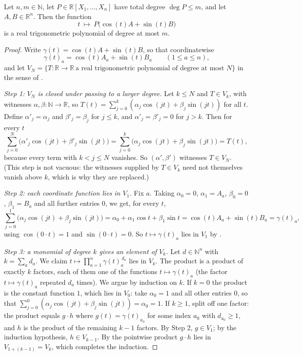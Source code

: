 \begin{lemma}
Let $n,m\in\mathbb{N}$, let $P\in\mathbb{R}[X_1,\dots,X_n]$ have total degree
$\deg P\le m$, and let $A,B\in\mathbb{R}^n$. Then the function
\[
  t\ \longmapsto\ P\bigl(\cos(t)A+\sin(t)B\bigr)
\]
is a real trigonometric polynomial of degree at most $m$.
\end{lemma}
\begin{proof}
Write $\gamma(t)=\cos(t)A+\sin(t)B$, so that coordinatewise
\begin{equation}\label{eq:gctp-coord}
  \gamma(t)_a=\cos(t)A_a+\sin(t)B_a\qquad(1\le a\le n),
\end{equation}
and let $V_N=\{T:\mathbb{R}\to\mathbb{R}\ \text{a real trigonometric polynomial
of degree at most }N\}$ in the sense of .

\emph{Step 1: $V_N$ is closed under passing to a larger degree.} Let $k\le N$ and
$T\in V_k$, with witnesses $\alpha,\beta:\mathbb{N}\to\mathbb{R}$, so
$T(t)=\sum_{j=0}^{k}(\alpha_j\cos(jt)+\beta_j\sin(jt))$ for all $t$. Define
$\alpha'_j=\alpha_j$ and $\beta'_j=\beta_j$ for $j\le k$, and
$\alpha'_j=\beta'_j=0$ for $j>k$. Then for every $t$
\[
  \sum_{j=0}^{N}\bigl(\alpha'_j\cos(jt)+\beta'_j\sin(jt)\bigr)
  =\sum_{j=0}^{k}\bigl(\alpha_j\cos(jt)+\beta_j\sin(jt)\bigr)=T(t),
\]
because every term with $k<j\le N$ vanishes. So $(\alpha',\beta')$ witnesses
$T\in V_N$. (This step is not vacuous: the witnesses supplied by $T\in V_k$ need
not themselves vanish above $k$, which is why they are replaced.)

\emph{Step 2: each coordinate function lies in $V_1$.} Fix $a$. Taking
$\alpha_0=0$, $\alpha_1=A_a$, $\beta_0=0$, $\beta_1=B_a$ and all further entries
$0$, we get, for every $t$,
\[
  \sum_{j=0}^{1}\bigl(\alpha_j\cos(jt)+\beta_j\sin(jt)\bigr)
  =\alpha_0+\alpha_1\cos t+\beta_1\sin t
  =\cos(t)A_a+\sin(t)B_a=\gamma(t)_a ,
\]
using $\cos(0\cdot t)=1$ and $\sin(0\cdot t)=0$. So $t\mapsto\gamma(t)_a$ lies in
$V_1$ by .

\emph{Step 3: a monomial of degree $k$ gives an element of $V_k$.} Let
$d\in\mathbb{N}^n$ with $k=\sum_a d_a$. We claim
$t\mapsto\prod_{a=1}^{n}\gamma(t)_a^{\,d_a}$ lies in $V_k$. The product is a
product of exactly $k$ factors, each of them one of the functions
$t\mapsto\gamma(t)_a$ (the factor $t\mapsto\gamma(t)_a$ repeated $d_a$ times).
We argue by induction on $k$. If $k=0$ the product is the constant function $1$,
which lies in $V_0$: take $\alpha_0=1$ and all other entries $0$, so that
$\sum_{j=0}^{0}(\alpha_j\cos(jt)+\beta_j\sin(jt))=\alpha_0=1$. If $k\ge1$, split
off one factor: the product equals $g\cdot h$ where $g(t)=\gamma(t)_{a_0}$ for
some index $a_0$ with $d_{a_0}\ge1$, and $h$ is the product of the remaining
$k-1$ factors. By Step 2, $g\in V_1$; by the induction hypothesis, $h\in V_{k-1}$.
By  the pointwise product $g\cdot h$ lies in
$V_{1+(k-1)}=V_k$, which completes the induction.


\end{proof}
